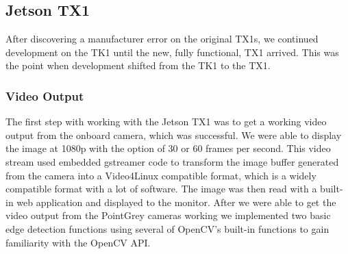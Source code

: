 \documentclass[letterpaper,10pt,titlepage]{IEEEtran}
\begin{document}
   \subsection{Jetson TX1}
   After discovering a manufacturer error on the original TX1s, we continued development on the TK1 until the new, fully functional, TX1 arrived. This was the point when development shifted from the TK1 to the TX1.\\ 
   
   \subsubsection{Video Output}
   The first step with working with the Jetson TX1 was to get a working video output from the onboard camera, which was successful. We were able to display the image at 1080p with the option of 30 or 60 frames per second. This video stream used embedded gstreamer code to transform the image buffer generated from the camera into a Video4Linux compatible format, which is a widely compatible format with a lot of software. The image was then read with a built-in web application and displayed to the monitor. After we were able to get the video output from the PointGrey cameras working we implemented two basic edge detection functions using several of OpenCV's built-in functions to gain familiarity with the OpenCV API.\\
   
\end{document}
